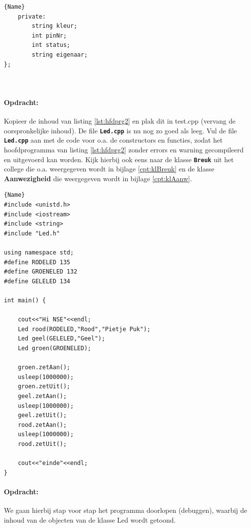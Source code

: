 \begin{enumerate}
\begin{itemize}
\begin{minipage}{.45\textwidth}
\begin{lstlisting}[caption=LED declaratie file(.h),frame=tlrb,label={lst:ledH}]{Name}
	private:
		string kleur;
		int pinNr;
		int status;  
		string eigenaar;
};
		
		
	\end{lstlisting}
	
\end{minipage}

\newpage	
\paragraph{Opdracht:} Kopieer de inhoud van listing \ref{lst:hfdprg2} en plak dit in test.cpp (vervang de oorspronkelijke inhoud). De file \textbf{\texttt{Led.cpp}} is nu nog zo goed als leeg. Vul de file \textbf{\texttt{Led.cpp}} aan met de code voor o.a. de constructors en functies, zodat het hoofdprogramma van listing \ref{lst:hfdprg2} zonder errors en warning gecompileerd en uitgevoerd kan worden. Kijk hierbij ook eens naar de klasse \textbf{\texttt{Breuk}} uit het college die o.a. weergegeven wordt in bijlage \ref{cpt:klBreuk} en de klasse \textbf{Aanwezigheid} die weergegeven wordt in bijlage \ref{cpt:klAanw}.
\begin{lstlisting}[caption=Hoofdprogramma om de LED uit te testen ,frame=tlrb, label={lst:hfdprg2}]{Name}
#include <unistd.h>
#include <iostream>
#include <string>
#include "Led.h"

using namespace std;
#define RODELED 135
#define GROENELED 132
#define GELELED 134

int main() {
	
	cout<<"Hi NSE"<<endl;
	Led rood(RODELED,"Rood","Pietje Puk");
	Led geel(GELELED,"Geel");
	Led groen(GROENELED);
	
	groen.zetAan();
	usleep(1000000);
	groen.zetUit();
	geel.zetAan();
	usleep(1000000);
	geel.zetUit();
	rood.zetAan();
	usleep(1000000);  
	rood.zetUit();
	
	cout<<"einde"<<endl;
}

\end{lstlisting}	
\end{itemize}
\end{enumerate}

\paragraph{Opdracht:}
We gaan hierbij stap voor stap het programma doorlopen (debuggen), waarbij de inhoud van de objecten van de klasse Led wordt getoond.

